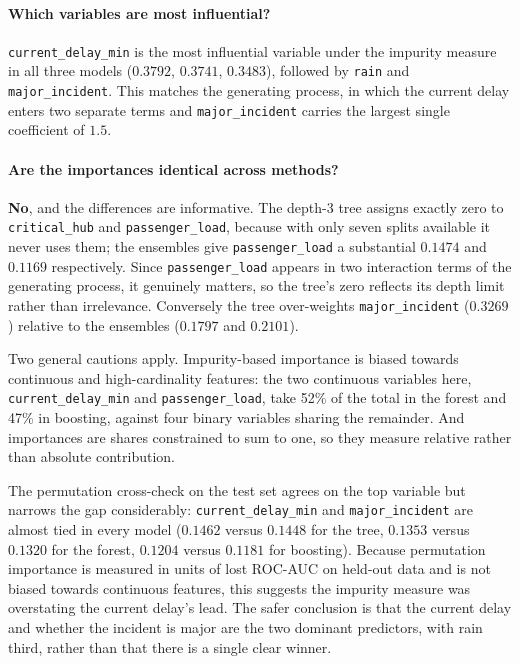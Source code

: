 \documentclass[11pt,a4paper]{article}
\newcommand{\code}[1]{\texttt{#1}}
\begin{document}
\paragraph{Which variables are most influential?} \code{current\_delay\_min} is the most
influential variable under the impurity measure in all three models ($0.3792$, $0.3741$,
$0.3483$), followed by \code{rain} and \code{major\_incident}. This matches the generating
process, in which the current delay enters two separate terms and \code{major\_incident}
carries the largest single coefficient of $1.5$.

\paragraph{Are the importances identical across methods?} \textbf{No}, and the differences
are informative. The depth-3 tree assigns exactly zero to \code{critical\_hub} and
\code{passenger\_load}, because with only seven splits available it never uses them; the
ensembles give \code{passenger\_load} a substantial $0.1474$ and $0.1169$ respectively.
Since \code{passenger\_load} appears in two interaction terms of the generating process, it
genuinely matters, so the tree's zero reflects its depth limit rather than irrelevance.
Conversely the tree over-weights \code{major\_incident} ($0.3269$) relative to the ensembles
($0.1797$ and $0.2101$).

Two general cautions apply. Impurity-based importance is biased towards continuous and
high-cardinality features: the two continuous variables here, \code{current\_delay\_min} and
\code{passenger\_load}, take 52\% of the total in the forest and 47\% in boosting, against
four binary variables sharing the remainder. And importances are shares constrained to sum
to one, so they measure relative rather than absolute contribution.

The permutation cross-check on the test set agrees on the top variable but narrows the gap
considerably: \code{current\_delay\_min} and \code{major\_incident} are almost tied in every
model ($0.1462$ versus $0.1448$ for the tree, $0.1353$ versus $0.1320$ for the forest,
$0.1204$ versus $0.1181$ for boosting). Because permutation importance is measured in units
of lost ROC-AUC on held-out data and is not biased towards continuous features, this
suggests the impurity measure was overstating the current delay's lead. The safer conclusion
is that the current delay and whether the incident is major are the two dominant predictors,
with rain third, rather than that there is a single clear winner.
\end{document}
